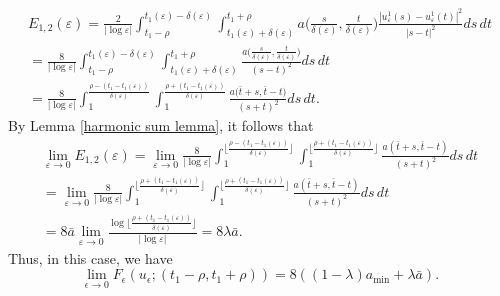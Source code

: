 \documentclass[12pt]{article}
\numberwithin{equation}{section}
\begin{document}
\begin{multline*}
   E_{1,2}(\varepsilon)= \frac{2}{|\log\varepsilon|}\int_{t_{1}-\rho}^{t_{1}(\varepsilon)-\delta(\varepsilon)}\int_{t_{1}(\varepsilon)+\delta(\varepsilon)}^{t_{1}+\rho}a\Big(\frac{s}{\delta(\varepsilon)},\frac{t}{\delta(\varepsilon)}\Big)\frac{\left|u^{1}_{\varepsilon}(s)-u^{1}_{\varepsilon}(t)\right|^2}{\left|s-t\right|^2}ds\,dt\\=\frac{8}{|\log\varepsilon|}\int_{t_{1}-\rho}^{t_{1}(\varepsilon)-\delta(\varepsilon)}\int_{t_{1}(\varepsilon)+\delta(\varepsilon)}^{t_{1}+\rho}\frac{a\big(\frac{s}{\delta(\varepsilon)},\frac{t}{\delta(\varepsilon)}\big)}{(s-t)^2}ds\,dt\\=\frac{8}{|\log\varepsilon|}\int_{1}^{\frac{\rho-(t_{1}-t_{1}(\varepsilon))}{\delta(\varepsilon)}}\int_{1}^{\frac{\rho+(t_{1}-t_{1}(\varepsilon))}{\delta(\varepsilon)}}\frac{a\big(\bar{t}+s,\bar{t}-t\big)}{(s+t)^2}ds\,dt.
\end{multline*}
By Lemma \ref{harmonic sum lemma}, it follows that 
\begin{align*}
\lim_{\varepsilon\to0}E_{1,2}(\varepsilon)=\lim_{\varepsilon\to0}\frac{8}{|\log\varepsilon|}\int_{1}^{\lfloor\frac{\rho-(t_{1}-t_{1}(\varepsilon))}{\delta(\varepsilon)}\rfloor}\int_{1}^{\lfloor\frac{\rho+(t_{1}-t_{1}(\varepsilon))}{\delta(\varepsilon)}\rfloor}\frac{a\left(\bar{t}+s,\bar{t}-t\right)}{(s+t)^2}ds\,dt\\=\lim_{\varepsilon\to0}\frac{8}{|\log\varepsilon|}\int_{1}^{\lfloor\frac{\rho+(t_{1}-t_{1}(\varepsilon))}{\delta(\varepsilon)}\rfloor}\int_{1}^{\lfloor\frac{\rho+(t_{1}-t_{1}(\varepsilon))}{\delta(\varepsilon)}\rfloor}\frac{a\left(\bar{t}+s,\bar{t}-t\right)}{(s+t)^2}ds\,dt\\=8\bar{a}\lim_{\varepsilon\to0}\frac{\log{\lfloor\frac{\rho+(t_{1}-t_{1}(\varepsilon))}{\delta(\varepsilon)}\rfloor}}{|\log\varepsilon|}=8\lambda\bar{a}.
\end{align*}
Thus, in this case, we have 
\[
\lim_{\epsilon\to 0}F_{\epsilon}(u_{\epsilon};(t_{1}-\rho,t_{1}+\rho))=8\left((1-\lambda)a_{\min}+\lambda\bar{a}\right).
\] 
\end{document}
